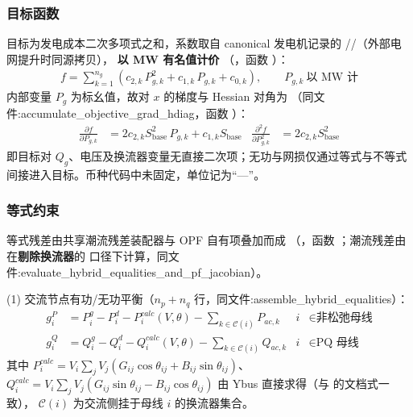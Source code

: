 \subsubsection*{目标函数}
目标为发电成本二次多项式之和，系数取自 canonical 发电机记录的
//（外部电网提升时同源拷贝），
\textbf{以 MW 有名值计价}
（，函数
）：
\begin{align*}
f = \sum_{k=1}^{n_g}\left(c_{2,k}\,P_{g,k}^{2} + c_{1,k}\,P_{g,k} + c_{0,k}\right),
\qquad P_{g,k}\ \text{以 MW 计}
\end{align*}
内部变量 $P_g$ 为标幺值，故对 $x$ 的梯度与 Hessian 对角为
（同文件:accumulate\_objective\_grad\_hdiag，函数 ）：
\begin{align*}
\frac{\partial f}{\partial P_{g,k}} &=
  2c_{2,k}S_{\mathrm{base}}^{2}\,P_{g,k} + c_{1,k}S_{\mathrm{base}} &
\frac{\partial^{2} f}{\partial P_{g,k}^{2}} &= 2c_{2,k}S_{\mathrm{base}}^{2}
\end{align*}
即目标对 $Q_g$、电压及换流器变量无直接二次项；无功与网损仅通过等式与不等式
间接进入目标。币种代码中未固定，单位记为``—''。

\subsubsection*{等式约束}
等式残差由共享潮流残差装配器与 OPF 自有项叠加而成
（，函数
；潮流残差由
 在\textbf{剔除换流器}的
口径下计算，同文件:evaluate\_hybrid\_equalities\_and\_pf\_jacobian）。

(1) 交流节点有功/无功平衡（$n_p+n_q$ 行，同文件:assemble\_hybrid\_equalities）：
\begin{align*}
g^{P}_i &= P^{g}_i - P^{d}_i - P^{calc}_i(V,\theta) - \sum_{k\in\mathcal{C}(i)} P_{ac,k}
 & i &\in \text{非松弛母线}\\
g^{Q}_i &= Q^{g}_i - Q^{d}_i - Q^{calc}_i(V,\theta) - \sum_{k\in\mathcal{C}(i)} Q_{ac,k}
 & i &\in \text{PQ 母线}
\end{align*}
其中 $P^{calc}_i=V_i\sum_j V_j(G_{ij}\cos\theta_{ij}+B_{ij}\sin\theta_{ij})$、
$Q^{calc}_i=V_i\sum_j V_j(G_{ij}\sin\theta_{ij}-B_{ij}\cos\theta_{ij})$ 由 Ybus
直接求得（与  的文档式一致），
$\mathcal{C}(i)$ 为交流侧挂于母线 $i$ 的换流器集合。

